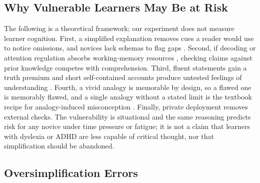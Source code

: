 \documentclass[journal,article,submit,pdftex,moreauthors]{Definitions/mdpi}
\begin{document}
\subsection{Why Vulnerable Learners May Be at Risk}

The following is a theoretical framework; our experiment does not measure learner cognition. First, a simplified explanation removes cues a reader would use to notice omissions, and novices lack schemas to flag gaps \cite{kalyuga2003expertise}. Second, if decoding or attention regulation absorbs working-memory resources \cite{baddeley1974working, laberge1974toward, sweller1998cognitive}, checking claims against prior knowledge competes with comprehension. Third, fluent statements gain a truth premium \cite{reber1999effects, alter2009uniting} and short self-contained accounts produce untested feelings of understanding \cite{rozenblit2002misunderstood}. Fourth, a vivid analogy is memorable by design, so a flawed one is memorably flawed, and a single analogy without a stated limit is the textbook recipe for analogy-induced misconception \cite{spiro1989multiple, glynn1991explaining}. Finally, private deployment removes external checks. The vulnerability is situational and the same reasoning predicts risk for any novice under time pressure or fatigue; it is not a claim that learners with dyslexia or ADHD are less capable of critical thought, nor that simplification should be abandoned.

\subsection{Oversimplification Errors}
\end{document}
